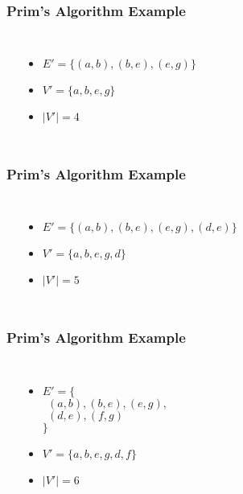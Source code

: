 \documentclass[dvipsnames]{beamer}
\begin{document}
\begin{frame}
  \frametitle{Prim's Algorithm Example}

  \begin{columns}
    \begin{center}
    \end{center}

    \pause
    \begin{itemize}
      \item $E' = \{ (a,b), (b,e), (e,g) \}$
      \item $V' = \{ a, b, e, g \}$
      \item $|V'| = 4$
    \end{itemize}
  \end{columns}
\end{frame}

\begin{frame}
  \frametitle{Prim's Algorithm Example}

  \begin{columns}
    \begin{center}
    \end{center}

    \pause
    \begin{itemize}
      \item $E' = \{ (a,b), (b,e), (e,g), (d,e) \}$
      \item $V' = \{ a, b, e, g, d \}$
      \item $|V'| = 5$
    \end{itemize}
  \end{columns}
\end{frame}

\begin{frame}
  \frametitle{Prim's Algorithm Example}

  \begin{columns}
    \begin{center}
    \end{center}

    \pause
    \begin{itemize}
      \item $E' = \{$\\
        $~~(a,b), (b,e), (e,g),$\\
        $~~(d,e), (f,g)$\\
        $\}$
      \item $V' = \{ a, b, e, g, d, f \}$
      \item $|V'| = 6$
    \end{itemize}
  \end{columns}
\end{frame}
\end{document}
